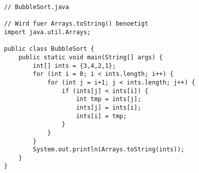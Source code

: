 \begin{center}  
\begin{lstlisting}
// BubbleSort.java

// Wird fuer Arrays.toString() benoetigt
import java.util.Arrays;

public class BubbleSort {
    public static void main(String[] args) {
        int[] ints = {3,4,2,1};
        for (int i = 0; i < ints.length; i++) {
            for (int j = i+1; j < ints.length; j++) {
                if (ints[j] < ints[i]) {
                    int tmp = ints[j];
                    ints[j] = ints[i];
                    ints[i] = tmp;
                }
            }
        }
        System.out.println(Arrays.toString(ints));
    }
}
\end{lstlisting}
\end{center}

